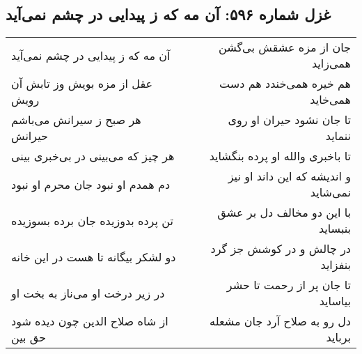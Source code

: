 \begin{center}
\section*{غزل شماره ۵۹۶: آن مه که ز پیدایی در چشم نمی‌آید}
\label{sec:0596}
\begin{longtable}{l p{0.5cm} r}
آن مه که ز پیدایی در چشم نمی‌آید
&&
جان از مزه عشقش بی‌گشن همی‌زاید
\\
عقل از مزه بویش وز تابش آن رویش
&&
هم خیره همی‌خندد هم دست همی‌خاید
\\
هر صبح ز سیرانش می‌باشم حیرانش
&&
تا جان نشود حیران او روی ننماید
\\
هر چیز که می‌بینی در بی‌خبری بینی
&&
تا باخبری والله او پرده بنگشاید
\\
دم همدم او نبود جان محرم او نبود
&&
و اندیشه که این داند او نیز نمی‌شاید
\\
تن پرده بدوزیده جان برده بسوزیده
&&
با این دو مخالف دل بر عشق بنبساید
\\
دو لشکر بیگانه تا هست در این خانه
&&
در چالش و در کوشش جز گرد بنفزاید
\\
در زیر درخت او می‌ناز به بخت او
&&
تا جان پر از رحمت تا حشر بیاساید
\\
از شاه صلاح الدین چون دیده شود حق بین
&&
دل رو به صلاح آرد جان مشعله برباید
\\
\end{longtable}
\end{center}
